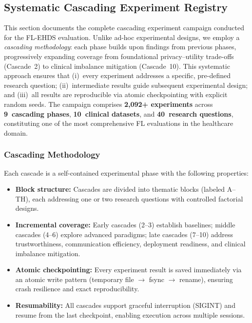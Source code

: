 \documentclass[conference]{IEEEtran}
\begin{document}
\subsection{Systematic Cascading Experiment Registry}
\label{sec:cascade_registry}

This section documents the complete cascading experiment campaign conducted for the FL-EHDS evaluation. Unlike ad-hoc experimental designs, we employ a \textit{cascading methodology}: each phase builds upon findings from previous phases, progressively expanding coverage from foundational privacy--utility trade-offs (Cascade~2) to clinical imbalance mitigation (Cascade~10). This systematic approach ensures that (i)~every experiment addresses a specific, pre-defined research question; (ii)~intermediate results guide subsequent experimental design; and (iii)~all results are reproducible via atomic checkpointing with explicit random seeds. The campaign comprises \textbf{2,092+ experiments} across \textbf{9~cascading phases}, \textbf{10~clinical datasets}, and \textbf{40~research questions}, constituting one of the most comprehensive FL evaluations in the healthcare domain.

\subsubsection{Cascading Methodology}

Each cascade is a self-contained experimental phase with the following properties:

\begin{itemize}
    \item \textbf{Block structure:} Cascades are divided into thematic blocks (labeled A--TH), each addressing one or two research questions with controlled factorial designs.
    \item \textbf{Incremental coverage:} Early cascades (2--3) establish baselines; middle cascades (4--6) explore advanced paradigms; late cascades (7--10) address trustworthiness, communication efficiency, deployment readiness, and clinical imbalance mitigation.
    \item \textbf{Atomic checkpointing:} Every experiment result is saved immediately via an atomic write pattern (temporary file $\to$ fsync $\to$ rename), ensuring crash resilience and exact reproducibility.
    \item \textbf{Resumability:} All cascades support graceful interruption (SIGINT) and resume from the last checkpoint, enabling execution across multiple sessions.
\end{itemize}
\end{document}
